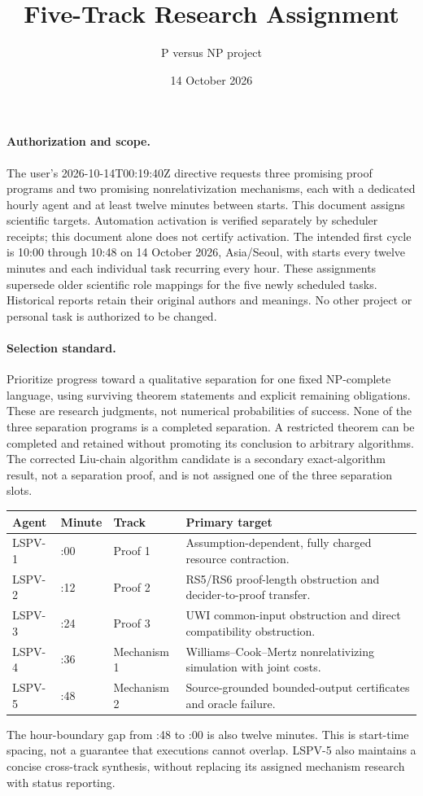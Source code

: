 \documentclass[11pt]{article}
\title{Five-Track Research Assignment}
\author{P versus NP project}
\date{14 October 2026}
\begin{document}
\maketitle
\paragraph{Authorization and scope.}
The user's 2026-10-14T00:19:40Z directive requests three promising proof programs and two promising nonrelativization mechanisms, each with a dedicated hourly agent and at least twelve minutes between starts. This document assigns scientific targets. Automation activation is verified separately by scheduler receipts; this document alone does not certify activation. The intended first cycle is 10:00 through 10:48 on 14 October 2026, Asia/Seoul, with starts every twelve minutes and each individual task recurring every hour. These assignments supersede older scientific role mappings for the five newly scheduled tasks. Historical reports retain their original authors and meanings. No other project or personal task is authorized to be changed.

\paragraph{Selection standard.}
Prioritize progress toward a qualitative separation for one fixed NP-complete language, using surviving theorem statements and explicit remaining obligations. These are research judgments, not numerical probabilities of success. None of the three separation programs is a completed separation. A restricted theorem can be completed and retained without promoting its conclusion to arbitrary algorithms. The corrected Liu-chain algorithm candidate is a secondary exact-algorithm result, not a separation proof, and is not assigned one of the three separation slots.

\begin{center}
\begin{tabularx}{\linewidth}{lllX}
\toprule
Agent & Minute & Track & Primary target\\
\midrule
LSPV-1 & :00 & Proof 1 & Assumption-dependent, fully charged resource contraction.\\
LSPV-2 & :12 & Proof 2 & RS5/RS6 proof-length obstruction and decider-to-proof transfer.\\
LSPV-3 & :24 & Proof 3 & UWI common-input obstruction and direct compatibility obstruction.\\
LSPV-4 & :36 & Mechanism 1 & Williams--Cook--Mertz nonrelativizing simulation with joint costs.\\
LSPV-5 & :48 & Mechanism 2 & Source-grounded bounded-output certificates and oracle failure.\\
\bottomrule
\end{tabularx}
\end{center}
The hour-boundary gap from :48 to :00 is also twelve minutes. This is start-time spacing, not a guarantee that executions cannot overlap. LSPV-5 also maintains a concise cross-track synthesis, without replacing its assigned mechanism research with status reporting.
\end{document}

